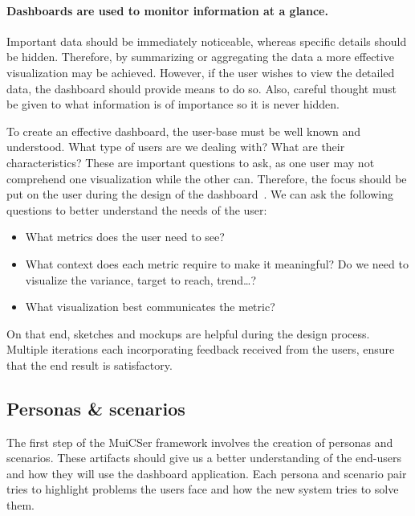         \paragraph{Dashboards are used to monitor information at a glance.} Important data should be immediately noticeable, whereas specific details should be hidden. Therefore, by summarizing or aggregating the data a more effective visualization may be achieved. However, if the user wishes to view the detailed data, the dashboard should provide means to do so. Also, careful thought must be given to what information is of importance so it is never hidden.\bigskip

        \noindent To create an effective dashboard, the user-base must be well known and understood. What type of users are we dealing with? What are their characteristics? These are important questions to ask, as one user may not comprehend one visualization while the other can. Therefore, the focus should be put on the user during the design of the dashboard~\cite{Brath2004}. We can ask the following questions to better understand the needs of the user:
        
        \begin{itemize}
            \item What metrics does the user need to see?
            \item What context does each metric require to make it meaningful? Do we need to visualize the variance, target to reach, trend\ldots?
            \item What visualization best communicates the metric?
        \end{itemize}

        \noindent On that end, sketches and mockups are helpful during the design process. Multiple iterations each incorporating feedback received from the users, ensure that the end result is satisfactory.

    \subsection{Personas \& scenarios}\label{personas_scenarios}

    The first step of the MuiCSer framework involves the creation of personas and scenarios. These artifacts should give us a better understanding of the end-users and how they will use the dashboard application. Each persona and scenario pair tries to highlight problems the users face and how the new system tries to solve them.

